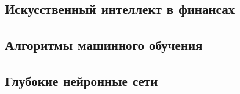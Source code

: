 \subsection{Искусственный интеллект в финансах}


\subsection{Алгоритмы машинного обучения}


\subsection{Глубокие нейронные сети}
